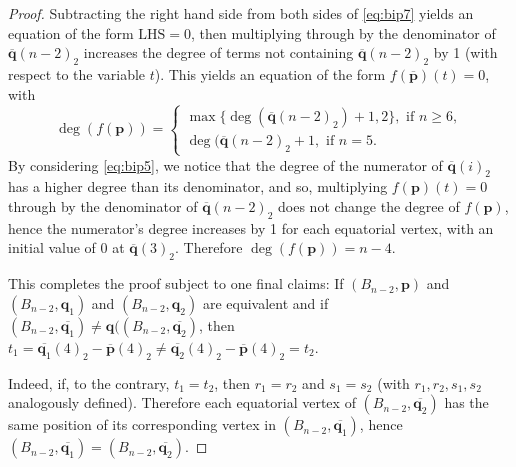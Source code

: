 \documentclass[10pt,a4paper]{amsart}
\begin{document}
\begin{proof}
    Subtracting the right hand side from both sides of \cref{eq:bip7} yields an equation of the form $\text{LHS}=0$, then multiplying through by the denominator of $\overline{\mathbf{q}}(n-2)_2$ increases the degree of terms not containing $\overline{\mathbf{q}}(n-2)_2$ by 1 (with respect to the variable $t$).
    This yields an equation of the form $f(\overline{\mathbf{p}})(t)=0$, with
    \begin{equation*}
        \deg(f(\mathbf{p}))=\begin{cases}
            \max\{\deg(\overline{\mathbf{q}}(n-2)_2)+1,2\},\text{ if }n\geq 6,\\
            \deg(\overline{\mathbf{q}}(n-2)_2+1,\text{ if }n=5.
        \end{cases}
    \end{equation*}
    By considering \cref{eq:bip5}, we notice that the degree of the numerator of $\overline{\mathbf{q}}(i)_2$ has a higher degree than its denominator, and so, multiplying $f(\mathbf{p})(t)=0$ through by the denominator of $\overline{\mathbf{q}}(n-2)_2$ does not change the degree of $f(\mathbf{p})$, hence the numerator's degree increases by 1 for each equatorial vertex, with an initial value of 0 at $\overline{\mathbf{q}}(3)_2$.
    Therefore $\deg(f(\mathbf{p}))=n-4$.

    This completes the proof subject to one final claims:
        If $(B_{n-2},\mathbf{p})$ and $(B_{n-2},\mathbf{q}_1)$ and $(B_{n-2},\mathbf{q}_2)$ are equivalent and if $(B_{n-2},\overline{\mathbf{q}_1})\ne\mathbf{q}((B_{n-2},\overline{\mathbf{q}_2})$, then $t_1=\overline{\mathbf{q}_1}(4)_2-\overline{\mathbf{p}}(4)_2\neq\overline{\mathbf{q}_2}(4)_2-\overline{\mathbf{p}}(4)_2=t_2$.

        Indeed, if, to the contrary, $t_1=t_2$, then $r_1=r_2$ and $s_1=s_2$ (with $r_1,r_2,s_1,s_2$ analogously defined).
        Therefore each equatorial vertex of $(B_{n-2},\overline{\mathbf{q}_2})$ has the same position of its corresponding vertex in $(B_{n-2},\overline{\mathbf{q}_1})$, hence $(B_{n-2},\overline{\mathbf{q}_1})=(B_{n-2},\overline{\mathbf{q}_2})$.
\end{proof}
\end{document}
